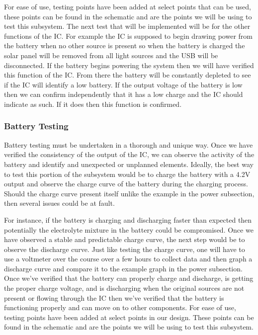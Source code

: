 For ease of use, testing points have been added at select points that can be used, these points can be found in the schematic and are the points we will be using to test this subsystem. The next test that will be implemented will be for the other functions of the IC. For example the IC is supposed to begin drawing power from the battery when no other source is present so when the battery is charged the solar panel will be removed from all light sources and the USB will be disconnected. If the battery begins powering the system then we will have verified this function of the IC. From there the battery will be constantly depleted to see if the IC will identify a low battery. If the output voltage of the battery is low then we can confirm independently that it has a low charge and the IC should indicate as such. If it does then this function is confirmed.

\subsubsection{Battery Testing}
Battery testing must be undertaken in a thorough and unique way. Once we have verified the consistency of the output of the IC, we can observe the activity of the battery and identify and unexpected or unplanned elements. Ideally, the best way to test this portion of the subsystem would be to charge the battery with a 4.2V output and observe the charge curve of the battery during the charging process. Should the charge curve present itself unlike the example in the power subsection, then several issues could be at fault. 

For instance, if the battery is charging and discharging faster than expected then potentially the electrolyte mixture in the battery could be compromised. Once we have observed a stable and predictable charge curve, the next step would be to observe the discharge curve. Just like testing the charge curve, one will have to use a voltmeter over the course over a few hours to collect data and then graph a discharge curve and compare it to the example graph in the power subsection. Once we've verified that the battery can properly charge and discharge, is getting the proper charge voltage, and is discharging when the original sources are not present or flowing through the IC then we've verified that the battery is functioning properly and can move on to other components. For ease of use, testing points have been added at select points in our design. These points can be found in the schematic and are the points we will be using to test this subsystem.

